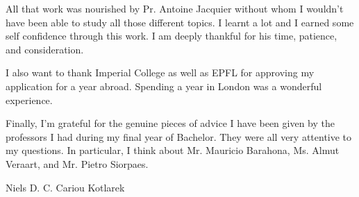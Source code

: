 \begin{acknowledgements}




All that work was nourished by Pr. Antoine Jacquier without whom I wouldn't have been able to study all those different topics. I learnt a lot and I earned some self confidence through this work. I am deeply thankful for his time, patience, and consideration. 

I also want to thank Imperial College as well as EPFL for approving my application for a year abroad. Spending a year in London was a wonderful experience.

Finally, I’m grateful for the genuine pieces of advice I have been given by the professors I had during my final year of Bachelor. They were all very attentive to my questions. In particular, I think about Mr. Mauricio Barahona, Ms. Almut Veraart, and Mr. Pietro Siorpaes.

Niels D. C. Cariou Kotlarek


\end{acknowledgements}